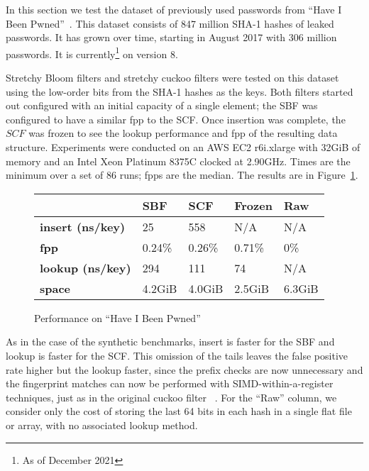 \documentclass[letterpaper,twocolumn,10pt]{article}
\newcommand{\taffy}{stretchy}
\newcommand{\Taffy}{Stretchy}
\newcommand{\TBF}{SBF}
\newcommand{\TCF}{SCF}
\newcommand{\taffy}{taffy}
\newcommand{\Taffy}{Taffy}
\newcommand{\TBF}{TBF}
\newcommand{\TCF}{TCF}
\begin{document}
In this section we test the dataset of previously used passwords from ``Have I Been Pwned''~\cite{pwned}.
This dataset consists of 847 million SHA-1 hashes of leaked passwords.
It has grown over time, starting in August 2017 with 306 million passwords. It is currently\footnote{As of December 2021} on version 8.

\Taffy{} Bloom filters and \taffy{} cuckoo filters were tested on this dataset using the low-order bits from the SHA-1 hashes as the keys.
Both filters started out configured with an initial capacity of a single element; the \TBF{} was configured to have a similar fpp to the \TCF{}.
Once insertion was complete, the $\TCF{}$ was frozen to see the lookup performance and fpp of the resulting data structure.
Experiments were conducted on an AWS EC2 r6i.xlarge with 32GiB of memory and an Intel Xeon Platinum 8375C clocked at 2.90GHz.
Times are the minimum over a set of 86 runs; fpps are the median.
The results are in Figure~\ref{hibp-table}.

\begin{figure}[b!]
\begin{tabular}{|m{0.5in}|m{0.5in}|m{0.5in}|m{0.5in}|m{0.5in}|}
\hline & {\bf \TBF{}} & {\bf \TCF{}} & {\bf Frozen} & {\bf Raw}\\
\hline {\bf insert (ns/key)} & 25 & 558 & N/A & N/A\\
\hline {\bf fpp} & 0.24\% & 0.26\% & 0.71\% & 0\%\\
\hline {\bf lookup (ns/key)} & 294 & 111 & 74 & N/A\\
\hline {\bf space} & 4.2GiB & 4.0GiB & 2.5GiB & 6.3GiB\\
\hline
\end{tabular}
\caption{\label{hibp-table}
Performance on ``Have I Been Pwned''}
\end{figure}

As in the case of the synthetic benchmarks, insert is faster for the \TBF{} and lookup is faster for the \TCF{}.
This omission of the tails leaves the false positive rate higher but the lookup faster, since the prefix checks are now unnecessary and the fingerprint matches can now be performed with SIMD-within-a-register techniques, just as in the original cuckoo filter ~\cite{cuckoo-filter-github}.
For the ``Raw'' column, we consider only the cost of storing the last 64 bits in each hash in a single flat file or array, with no associated lookup method.
\end{document}
